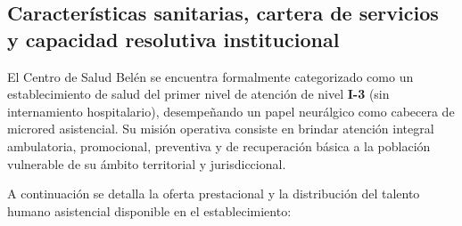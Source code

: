 \subsection{Características sanitarias, cartera de servicios y capacidad resolutiva institucional}
\label{sec:2.5_sanitaria}

El Centro de Salud Belén se encuentra formalmente categorizado como un establecimiento de salud del primer nivel de atención de nivel \textbf{I-3} (sin internamiento hospitalario), desempeñando un papel neurálgico como cabecera de microred asistencial. Su misión operativa consiste en brindar atención integral ambulatoria, promocional, preventiva y de recuperación básica a la población vulnerable de su ámbito territorial y jurisdiccional.

A continuación se detalla la oferta prestacional y la distribución del talento humano asistencial disponible en el establecimiento:


